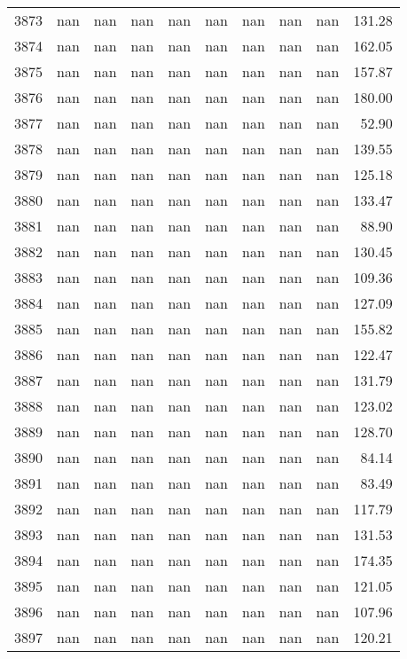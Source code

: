 \begin{tabular}{lrrrrrrrrr}
3873 & nan & nan & nan & nan & nan & nan & nan & nan & 131.28 \\
3874 & nan & nan & nan & nan & nan & nan & nan & nan & 162.05 \\
3875 & nan & nan & nan & nan & nan & nan & nan & nan & 157.87 \\
3876 & nan & nan & nan & nan & nan & nan & nan & nan & 180.00 \\
3877 & nan & nan & nan & nan & nan & nan & nan & nan & 52.90 \\
3878 & nan & nan & nan & nan & nan & nan & nan & nan & 139.55 \\
3879 & nan & nan & nan & nan & nan & nan & nan & nan & 125.18 \\
3880 & nan & nan & nan & nan & nan & nan & nan & nan & 133.47 \\
3881 & nan & nan & nan & nan & nan & nan & nan & nan & 88.90 \\
3882 & nan & nan & nan & nan & nan & nan & nan & nan & 130.45 \\
3883 & nan & nan & nan & nan & nan & nan & nan & nan & 109.36 \\
3884 & nan & nan & nan & nan & nan & nan & nan & nan & 127.09 \\
3885 & nan & nan & nan & nan & nan & nan & nan & nan & 155.82 \\
3886 & nan & nan & nan & nan & nan & nan & nan & nan & 122.47 \\
3887 & nan & nan & nan & nan & nan & nan & nan & nan & 131.79 \\
3888 & nan & nan & nan & nan & nan & nan & nan & nan & 123.02 \\
3889 & nan & nan & nan & nan & nan & nan & nan & nan & 128.70 \\
3890 & nan & nan & nan & nan & nan & nan & nan & nan & 84.14 \\
3891 & nan & nan & nan & nan & nan & nan & nan & nan & 83.49 \\
3892 & nan & nan & nan & nan & nan & nan & nan & nan & 117.79 \\
3893 & nan & nan & nan & nan & nan & nan & nan & nan & 131.53 \\
3894 & nan & nan & nan & nan & nan & nan & nan & nan & 174.35 \\
3895 & nan & nan & nan & nan & nan & nan & nan & nan & 121.05 \\
3896 & nan & nan & nan & nan & nan & nan & nan & nan & 107.96 \\
3897 & nan & nan & nan & nan & nan & nan & nan & nan & 120.21 \\

\end{tabular}
